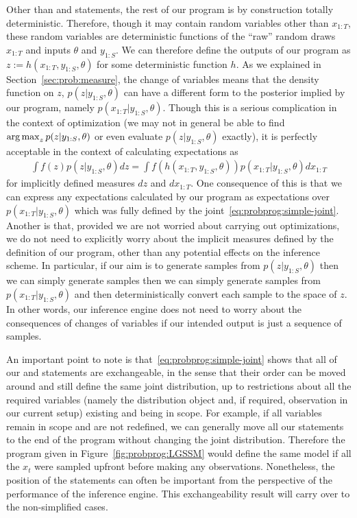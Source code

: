 Other than \sample and \observe statements, the rest of our program is by construction totally deterministic.  Therefore,
though it may contain random variables other than $x_{1:T}$, these random variables are deterministic
functions of the ``raw'' random draws $x_{1:T}$ and inputs $\theta$ and $y_{1:S}$.  We can therefore 
define the outputs of our program as $z := h(x_{1:T},y_{1:S},\theta)$ for some deterministic function $h$.
As we explained in Section~\ref{sec:prob:measure}, the change of variables means that the density function on $z$,
$p(z | y_{1:S}, \theta) $
can have a different form to the posterior implied by our program, namely $p(x_{1:T} | y_{1:S}, \theta)$.
  Though this is a serious complication in the
context of optimization (we may not in general be able to find $\operatorname*{arg\,max}_z p(z|y_{1:S},\theta)$
or even evaluate $p(z | y_{1:S}, \theta)$ exactly), it
is perfectly acceptable in the context of calculating expectations as
\begin{align}
\int f(z) p(z | y_{1:S}, \theta) dz = \int f(h(x_{1:T}, y_{1:S}, \theta)) p(x_{1:T} | y_{1:S}, \theta) dx_{1:T}
\end{align}
for implicitly defined measures $dz$ and $dx_{1:T}$.  One consequence of this is that
we can express any expectations calculated by our program as expectations over $p(x_{1:T} | y_{1:S}, \theta)$
which was fully defined by the joint~\eqref{eq:probprog:simple-joint}.  Another is that, provided we are not worried
about carrying out optimizations, we do not need to explicitly worry about the implicit measures defined
by the definition of our program, other than any potential effects on the inference scheme.  In particular,
if our aim is to generate samples from $p(z | y_{1:S}, \theta)$ then we can simply generate samples then
we can simply generate samples from $p(x_{1:T} | y_{1:S}, \theta)$ and then deterministically convert each
sample to the space of $z$.  In other words, our inference engine does not need to worry about
the consequences of changes of variables if our intended output is just a sequence of samples.

An important point to note is that~\eqref{eq:probprog:simple-joint} shows that all of our \sample
and \observe statements are exchangeable, in the sense that their order can be moved around and
still define the same joint distribution, up to restrictions about all the required variables (namely the
distribution object and, if required, observation in our current setup) existing and being in scope.  
For example, if all variables remain in scope
and are not redefined, we can generally move all our \observe statements to the end of the program
without changing the joint distribution.  Therefore the program given in Figure~\ref{fig:probprog:LGSSM}
would define the same model if all the $x_t$ were sampled upfront before making any observations.
Nonetheless, the position of the \observe statements
can often be important from the perspective of the performance of the inference engine.  This exchangeability
result will carry over to the non-simplified cases.

